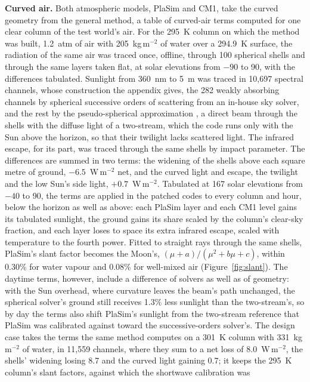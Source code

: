 \textbf{Curved air.} Both atmospheric models, PlaSim and CM1, take the curved geometry from the general method,
a table of curved-air terms computed for one clear column of the test world's air. For the 295~K column on which
the method was built, 1.2~atm of air with 205~kg\,m$^{-2}$ of water over a 294.9~K surface, the radiation of the
same air was traced once, offline, through 100 spherical shells
and through the same layers taken flat, at solar elevations from $-90$ to 90\textdegree, with the differences
tabulated. Sunlight from 360~nm to 5~\textmu m was traced in 10,697 spectral channels, whose construction the
appendix gives, the 282 weakly absorbing channels by spherical successive orders of scattering from an in-house
sky solver, and the rest by the pseudo-spherical approximation \autocite{dahlback1991new,kylling1995reliable}, a
direct beam through the shells with the diffuse light of a two-stream, which the code runs only with the Sun above
the horizon, so that their twilight lacks scattered light. The infrared escape, for its part, was traced through
the same shells by impact parameter. The differences are summed in two terms: the widening of the shells above
each square metre of ground, $-6.5$~W\,m$^{-2}$ net, and the curved light and escape, the twilight and the low
Sun's side light, $+0.7$~W\,m$^{-2}$. Tabulated at 167 solar elevations from $-40$ to 90\textdegree,
the terms are applied in the patched codes to every column and hour, below the horizon as well as above: each
PlaSim layer and each CM1 level gains its tabulated sunlight, the ground gains its share scaled by the column's
clear-sky fraction, and each layer loses to space its extra infrared escape, scaled with temperature to the
fourth power. Fitted to straight rays through the same shells, PlaSim's slant factor becomes the Moon's,
$(\mu+a)/(\mu^2+b\mu+c)$, within 0.30\% for water vapour and 0.08\% for well-mixed air
(Figure~\ref{fig:slant}). The daytime terms, however, include a difference of solvers as well as of
geometry: with the Sun overhead, where curvature leaves the beam's path unchanged, the spherical solver's ground
still receives 1.3\% less sunlight than the two-stream's, so by day the terms also shift PlaSim's sunlight from the two-stream reference that PlaSim was calibrated against toward the successive-orders solver's. The design case takes the terms the same method computes on a 301~K column with 331~kg\,m$^{-2}$ of
water, in 11,559 channels, where they sum to a net loss of 8.0~W\,m$^{-2}$, the shells' widening losing 8.7 and the
curved light gaining 0.7; it keeps the 295~K column's slant factors, against which the shortwave calibration was
